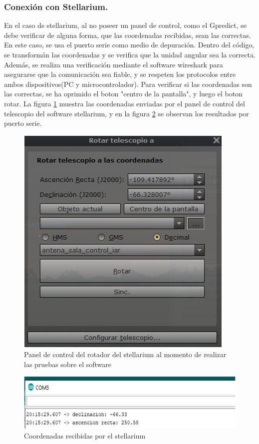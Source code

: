 \subsubsection{Conexión con Stellarium.} 

En el caso de stellarium, al no poseer un panel de control, como el Gpredict, se debe verificar de alguna forma, que las coordenadas recibidas, sean las correctas. En este caso, se usa el puerto serie como medio de depuración. Dentro del código, se transformán las coordenadas y se verifica que la unidad angular sea la correcta. Además, se realiza una verificación mediante el software wireshark para asegurarse que la comunicación sea fiable, y se respeten los protocolos entre ambos dispositivos(PC y microcontrolador).
Para verificar si las coordenadas son las correctas, se ha oprimido el boton "centro de la pantalla", y luego el boton rotar. La figura \ref{fig:rotador_antena_stell_test} muestra las coordenadas enviadas por el panel de control del telescopio del software stellarium, y en la figura \ref{fig:coord_test_stell} se observan los resultados por puerto serie. 

\begin{figure}[ht!]
	\includegraphics{rotador_antena_stell} 
	\caption{Panel de control del rotador del stellarium al momento de realizar las pruebas sobre el software} 
	\label{fig:rotador_antena_stell_test}
\end{figure}

\begin{figure}[ht!]
	\includegraphics{puerto_comm_stellarium}
	\caption{Coordenadas recibidas por el stellarium}
	\label{fig:coord_test_stell}
\end{figure}


